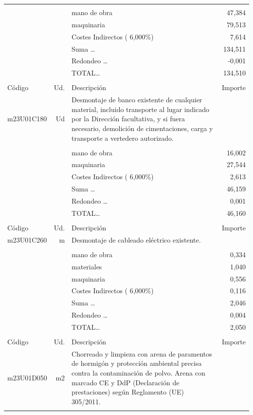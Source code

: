 \begin{supertabular}{l r p{60mm} r}
&&&\\%
&&mano de obra&    47,384\\%
&&maquinaria&    79,513\\%
&&Costes Indirectos (     6,000\%)&     7,614\\%
&&Suma \ldots&   134,511\\%
&&Redondeo \ldots&    {-}0,001\\%
%
&&TOTAL\ldots&   134,510\\%
&&&\\%
Código&Ud.&Descripción&Importe\\%
\hline%
m23U01C180&Ud&Desmontaje de banco existente de cualquier material, incluido transporte al lugar indicado por la Dirección facultativa, y si fuera necesario, demolición de cimentaciones, carga y transporte a vertedero autorizado.&\\%
&&&\\%
&&mano de obra&    16,002\\%
&&maquinaria&    27,544\\%
&&Costes Indirectos (     6,000\%)&     2,613\\%
&&Suma \ldots&    46,159\\%
&&Redondeo \ldots&     0,001\\%
%
&&TOTAL\ldots&    46,160\\%
&&&\\%
Código&Ud.&Descripción&Importe\\%
\hline%
m23U01C260&m&Desmontaje de cableado eléctrico existente.&\\%
&&&\\%
&&mano de obra&     0,334\\%
&&materiales&     1,040\\%
&&maquinaria&     0,556\\%
&&Costes Indirectos (     6,000\%)&     0,116\\%
&&Suma \ldots&     2,046\\%
&&Redondeo \ldots&     0,004\\%
%
&&TOTAL\ldots&     2,050\\%
&&&\\%
Código&Ud.&Descripción&Importe\\%
\hline%
m23U01D050&m2&Chorreado y limpieza con arena de paramentos de hormigón y protección ambiental precisa contra la contaminación de polvo. Arena con marcado CE y DdP (Declaración de prestaciones) según Reglamento (UE) 305/2011.&\\%
&&&\\%

\end{supertabular}

